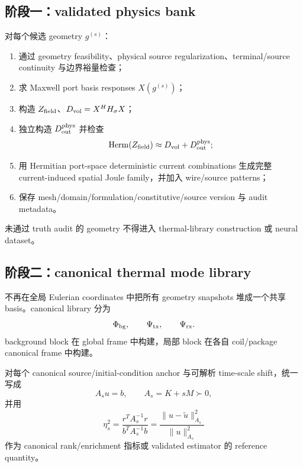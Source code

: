 \subsection{阶段一：validated physics bank}
对每个候选 geometry $g^{(s)}$：
\begin{enumerate}
  \item 通过 geometry feasibility、physical source regularization、terminal/source continuity 与边界裕量检查；
  \item 求 Maxwell port basis responses $X(g^{(s)})$；
  \item 构造 $Z_{\rm field}$、$D_{\rm vol}=X^HH_\sigma X$；
  \item 独立构造 $D_{\rm out}^{\rm phys}$ 并检查
  \begin{equation}
  \operatorname{Herm}(Z_{\rm field})\approx D_{\rm vol}+D_{\rm out}^{\rm phys};
  \end{equation}
  \item 用 Hermitian port-space deterministic current combinations 生成完整 current-induced spatial Joule family，并加入 wire/source patterns；
  \item 保存 mesh/domain/formulation/constitutive/source version 与 audit metadata。
\end{enumerate}
未通过 truth audit 的 geometry 不得进入 thermal-library construction 或 neural dataset。

\subsection{阶段二：canonical thermal mode library}
不再在全局 Eulerian coordinates 中把所有 geometry snapshots 堆成一个共享 basis。canonical library 分为
\begin{equation}
\Phi_{\rm bg},\qquad\Psi_{\rm tx},\qquad\Psi_{\rm rx}.
\end{equation}
background block 在 global frame 中构建，局部 block 在各自 coil/package canonical frame 中构建。

对每个 canonical source/initial-condition anchor 与可解析 time-scale shift，统一写成
\begin{equation}
A_su=b,\qquad A_s=K+sM\succ0,
\end{equation}
并用
\begin{equation}
\boxed{
\eta_s^2
=\frac{r^TA_s^{-1}r}{b^TA_s^{-1}b}
=\frac{\|u-\tilde u\|_{A_s}^2}{\|u\|_{A_s}^2}
}
\end{equation}
作为 canonical rank/enrichment 指标或 validated estimator 的 reference quantity。

